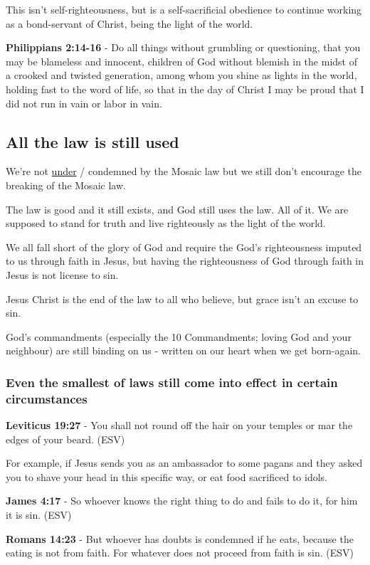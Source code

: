 \documentclass[11pt]{article}
\begin{document}
This isn't self-righteousness, but is a self-sacrificial obedience to continue working as a bond-servant of Christ, being the light of the world.

\textbf{Philippians 2:14-16} - Do all things without grumbling or questioning, that you may be blameless and innocent, children of God without blemish in the midst of a crooked and twisted generation, among whom you shine as lights in the world, holding fast to the word of life, so that in the day of Christ I may be proud that I did not run in vain or labor in vain.

\subsection{All the law is still used}
\label{sec:org9b0963f}
We're not \uline{under} / condemned by the Mosaic law but we still don't encourage the breaking of the Mosaic law.

The law is good and it still exists, and God still uses the law. All of it. We are supposed to stand for truth and live righteously as the light of the world.

We all fall short of the glory of God and require the God's righteousness imputed to us through faith in Jesus, but having the righteousness of God through faith in Jesus is not license to sin.

Jesus Christ is the end of the law to all who believe, but grace isn't an excuse to sin.

God's commandments (especially the 10 Commandments; loving God and your neighbour) are still binding on us - written on our heart when we get born-again.

\subsubsection{Even the smallest of laws still come into effect in certain circumstances}
\label{sec:orgd0b78df}

\textbf{Leviticus 19:27} - You shall not round off the hair on your temples or mar the edges of your beard. (ESV)

For example, if Jesus sends you as an ambassador to some pagans and they asked you to shave your head in this specific way, or eat food sacrificed to idols.

\textbf{James 4:17} - So whoever knows the right thing to do and fails to do it, for him it is sin. (ESV)

\textbf{Romans 14:23} - But whoever has doubts is condemned if he eats, because the eating is not from faith. For whatever does not proceed from faith is sin. (ESV)
\end{document}
